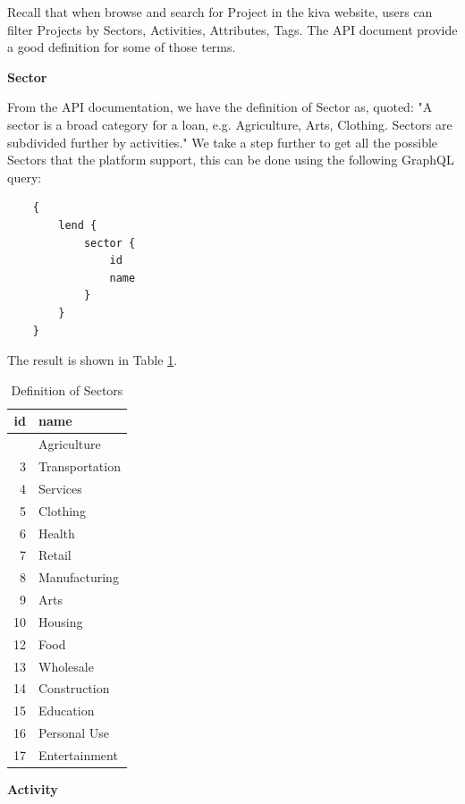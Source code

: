 Recall that when browse and search for Project in the kiva website,
users can filter Projects by Sectors, Activities, Attributes, Tags.
The API document provide a good definition for some of those terms.

\textbf{Sector}

From the API documentation, we have the definition of Sector as, quoted:
"A sector is a broad category for a loan, e.g. Agriculture, Arts, Clothing. Sectors are subdivided further by activities."
We take a step further to get all the possible Sectors that the platform support,
this can be done using the following GraphQL query:

\begin{lstlisting}
    {
        lend {
            sector {
                id
                name
            }
        }
    }
\end{lstlisting}

The result is shown in Table \ref{tab:sector-definition}.

\begin{longtable}[]{@{}rl@{}}
	\caption{Definition of Sectors}
	\label{tab:sector-definition} \\
	\toprule\noalign{}
	id & name                     \\
	\midrule\noalign{}
	\endhead
	\bottomrule\noalign{}
	\endlastfoot
	1  & Agriculture              \\
	3  & Transportation           \\
	4  & Services                 \\
	5  & Clothing                 \\
	6  & Health                   \\
	7  & Retail                   \\
	8  & Manufacturing            \\
	9  & Arts                     \\
	10 & Housing                  \\
	12 & Food                     \\
	13 & Wholesale                \\
	14 & Construction             \\
	15 & Education                \\
	16 & Personal Use             \\
	17 & Entertainment            \\
\end{longtable}

\textbf{Activity}

